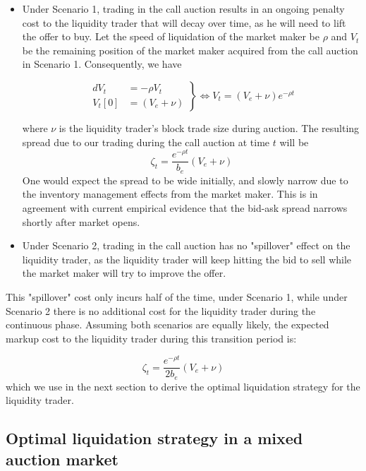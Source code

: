 \begin{itemize}
  \item Under Scenario 1, trading in the call auction results in an ongoing penalty cost to the liquidity trader that will decay over time, as he will need to lift the offer to buy. Let the speed of liquidation of the market maker be $\rho$ and $V_t$ be the remaining position of the market maker acquired from the call auction in Scenario 1. Consequently, we have

        \begin{equation}\label{eqn:recovery_term_eqb}
          \left.\begin{aligned}
            dV_t   & = -\rho V_t  \\
            V_t[0] & =(V_e + \nu)
          \end{aligned}\right\} \Leftrightarrow V_t = (V_e + \nu) e^{-\rho t}
        \end{equation}

        where $\nu$ is the liquidity trader's block trade size during auction. The resulting spread due to our trading during the call auction at time $t$ will be
        \[
          \zeta_t = \frac{e^{-\rho t}}{b_e}  (V_e + \nu)
        \]
        One would expect the spread to be wide initially, and slowly narrow due to the inventory management effects from the market maker. This is in agreement with current empirical evidence that the bid-ask spread narrows shortly after market opens.
  \item Under Scenario 2, trading in the call auction has no "spillover" effect on the liquidity trader, as the liquidity trader will keep hitting the bid to sell while the market maker will try to improve the offer.
\end{itemize}

This "spillover" cost only incurs half of the time, under Scenario 1, while under Scenario 2 there is no additional cost for the liquidity trader during the continuous phase. Assuming both scenarios are equally likely, the expected markup cost to the liquidity trader during this transition period is:

\begin{equation}\label{resilence_term}
  \zeta_t = \frac{e^{-\rho t}}{2 b_e}  (V_e + \nu)
\end{equation}
which we use in the next section to derive the optimal liquidation strategy for the liquidity trader.

\subsection{Optimal liquidation strategy in a mixed auction market}

